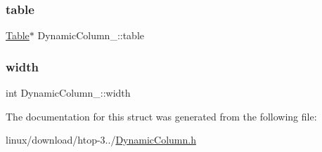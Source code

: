\subsubsection{\texorpdfstring{table}{table}}
{\footnotesize\ttfamily \hyperlink{Table_8h_a799795dd983fdfee2e48cc52cdceb05d}{Table}$\ast$ Dynamic\+Column\+\_\+\+::table}

\mbox{\label{structDynamicColumn___a9c73157c44a388cad5ff84b589dbfb97}} 
\subsubsection{\texorpdfstring{width}{width}}
{\footnotesize\ttfamily int Dynamic\+Column\+\_\+\+::width}



The documentation for this struct was generated from the following file\+:\begin{DoxyCompactItemize}
\item 
linux/download/htop-\/3../\hyperlink{DynamicColumn_8h}{Dynamic\+Column.\+h}\end{DoxyCompactItemize}
